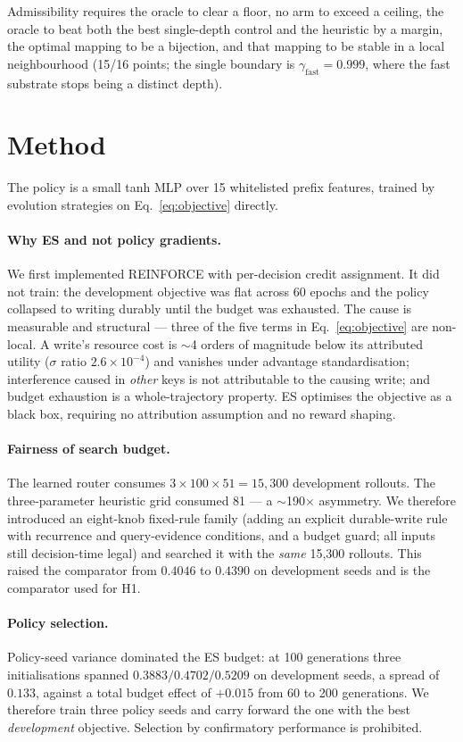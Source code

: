 \documentclass[11pt]{article}
\begin{document}
Admissibility requires the oracle to clear a floor, no arm to exceed a ceiling,
the oracle to beat both the best single-depth control and the heuristic by a
margin, the optimal mapping to be a bijection, and that mapping to be stable in
a local neighbourhood (15/16 points; the single boundary is
$\gamma_{\text{fast}} = 0.999$, where the fast substrate stops being a distinct
depth).

\section{Method}

The policy is a small tanh MLP over 15 whitelisted prefix features, trained by
evolution strategies on Eq.~\eqref{eq:objective} directly.

\paragraph{Why ES and not policy gradients.} We first implemented REINFORCE with
per-decision credit assignment. It did not train: the development objective was
flat across 60 epochs and the policy collapsed to writing durably until the
budget was exhausted. The cause is measurable and structural --- three of the
five terms in Eq.~\eqref{eq:objective} are non-local. A write's resource cost is
$\sim$4 orders of magnitude below its attributed utility ($\sigma$ ratio
$2.6\times10^{-4}$) and vanishes under advantage standardisation; interference
caused in \emph{other} keys is not attributable to the causing write; and budget
exhaustion is a whole-trajectory property. ES optimises the objective as a black
box, requiring no attribution assumption and no reward shaping.

\paragraph{Fairness of search budget.} The learned router consumes
$3 \times 100 \times 51 = 15{,}300$ development rollouts. The three-parameter
heuristic grid consumed 81 --- a $\sim$190$\times$ asymmetry. We therefore
introduced an eight-knob fixed-rule family (adding an explicit durable-write
rule with recurrence and query-evidence conditions, and a budget guard; all
inputs still decision-time legal) and searched it with the \emph{same} 15,300
rollouts. This raised the comparator from $0.4046$ to $0.4390$ on development
seeds and is the comparator used for H1.

\paragraph{Policy selection.} Policy-seed variance dominated the ES budget: at
100 generations three initialisations spanned $0.3883 / 0.4702 / 0.5209$ on
development seeds, a spread of $0.133$, against a total budget effect of
$+0.015$ from 60 to 200 generations. We therefore train three policy seeds and
carry forward the one with the best \emph{development} objective. Selection by
confirmatory performance is prohibited.
\end{document}
